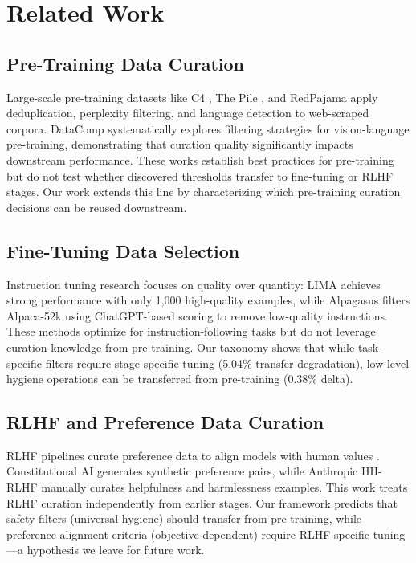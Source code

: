 \section{Related Work}

\subsection{Pre-Training Data Curation}

Large-scale pre-training datasets like C4 \cite{raffel2020exploring}, The Pile \cite{gao2020pile}, and RedPajama apply deduplication, perplexity filtering, and language detection to web-scraped corpora. DataComp \cite{gadre2023datacomp} systematically explores filtering strategies for vision-language pre-training, demonstrating that curation quality significantly impacts downstream performance. These works establish best practices for pre-training but do not test whether discovered thresholds transfer to fine-tuning or RLHF stages. Our work extends this line by characterizing which pre-training curation decisions can be reused downstream.

\subsection{Fine-Tuning Data Selection}

Instruction tuning research focuses on quality over quantity: LIMA \cite{zhou2023lima} achieves strong performance with only 1,000 high-quality examples, while Alpagasus \cite{chen2023alpagasus} filters Alpaca-52k using ChatGPT-based scoring to remove low-quality instructions. These methods optimize for instruction-following tasks but do not leverage curation knowledge from pre-training. Our taxonomy shows that while task-specific filters require stage-specific tuning (5.04\% transfer degradation), low-level hygiene operations can be transferred from pre-training (0.38\% delta).

\subsection{RLHF and Preference Data Curation}

RLHF pipelines curate preference data to align models with human values \cite{ouyang2022training, bai2022constitutional}. Constitutional AI \cite{bai2022constitutional} generates synthetic preference pairs, while Anthropic HH-RLHF manually curates helpfulness and harmlessness examples. This work treats RLHF curation independently from earlier stages. Our framework predicts that safety filters (universal hygiene) should transfer from pre-training, while preference alignment criteria (objective-dependent) require RLHF-specific tuning—a hypothesis we leave for future work.

